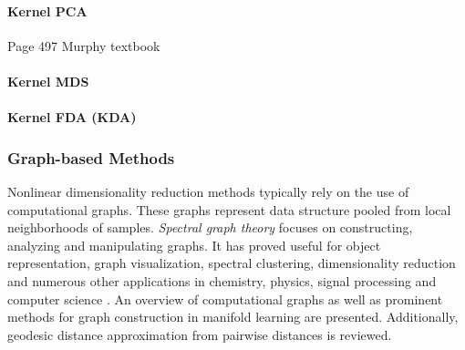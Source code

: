 \paragraph{Kernel PCA}

Page 497 Murphy textbook

\paragraph{Kernel MDS}

\paragraph{Kernel FDA (KDA)}

\subsubsection{Graph-based Methods}
Nonlinear dimensionality reduction methods typically rely on the use of computational graphs.  These graphs represent data structure pooled from local neighborhoods of samples.  \textit{Spectral graph theory} focuses on constructing, analyzing and manipulating graphs.  It has proved useful for object representation, graph visualization, spectral clustering, dimensionality reduction and numerous other applications in chemistry, physics, signal processing and computer science \citep{Shuman2013SignalProcessingGraphs, Bengoetxea2002ThesisGraphMatching}.   An overview of computational graphs as well as prominent methods for graph construction in manifold learning are presented. Additionally, geodesic distance approximation from pairwise distances is reviewed.

